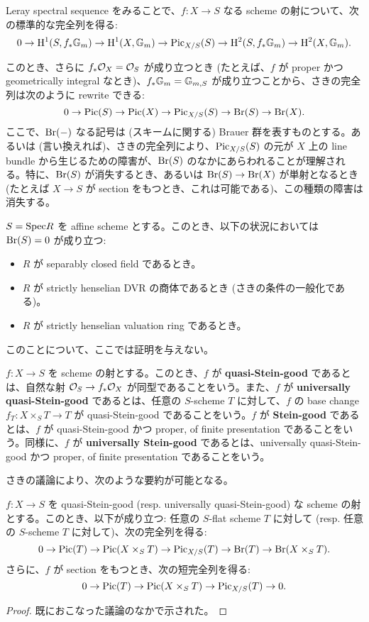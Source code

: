 Leray spectral sequence をみることで、$f \colon X \to S$ なる scheme の射について、次の標準的な完全列を得る: \[0 \to \mathrm{H}^1(S, f_*\mathbb{G}_m) \to \mathrm{H}^1(X, \mathbb{G}_m) \to \mathrm{Pic}_{X / S}(S) \to \mathrm{H}^2(S, f_*\mathbb{G}_m) \to \mathrm{H}^2(X, \mathbb{G}_m).\]

このとき、さらに $f_*\mathcal{O}_X = \mathcal{O}_S$ が成り立つとき (たとえば、$f$ が proper かつ geometrically integral なとき)、$f_*\mathbb{G}_m = \mathbb{G}_{m,S}$ が成り立つことから、さきの完全列は次のように rewrite できる: \[0 \to \mathrm{Pic}(S) \to \mathrm{Pic}(X) \to \mathrm{Pic}_{X / S}(S) \to \mathrm{Br}(S) \to \mathrm{Br}(X).\] ここで、$\mathrm{Br}(-)$ なる記号は (スキームに関する) Brauer 群を表すものとする。あるいは (言い換えれば)、さきの完全列により、$\mathrm{Pic}_{X / S}(S)$ の元が $X$ 上の line bundle から生じるための障害が、$\mathrm{Br}(S)$ のなかにあらわれることが理解される。特に、$\mathrm{Br}(S)$ が消失するとき、あるいは $\mathrm{Br}(S) \to \mathrm{Br}(X)$ が単射となるとき (たとえば $X \to S$ が section をもつとき、これは可能である)、この種類の障害は消失する。

\begin{note}
  $S = \mathrm{Spec} R$ を affine scheme とする。このとき、以下の状況においては $\mathrm{Br}(S) = 0$ が成り立つ:
  \begin{itemize}
    \item $R$ が separably closed field であるとき。
    \item $R$ が strictly henselian DVR の商体であるとき (さきの条件の一般化である)。
    \item $R$ が strictly henselian valuation ring であるとき。
  \end{itemize}
  このことについて、ここでは証明を与えない。
\end{note}

\begin{defn}
  $f \colon X \to S$ を scheme の射とする。このとき、$f$ が \textbf{quasi-Stein-good} であるとは、自然な射 $\mathcal{O}_S \to f_*\mathcal{O}_X$ が同型であることをいう。また、$f$ が \textbf{universally quasi-Stein-good} であるとは、任意の $S$-scheme $T$ に対して、$f$ の base change $f_T \colon X \times_S T \to T$ が quasi-Stein-good であることをいう。$f$ が \textbf{Stein-good} であるとは、$f$ が quasi-Stein-good かつ proper, of finite presentation であることをいう。同様に、$f$ が \textbf{universally Stein-good} であるとは、universally quasi-Stein-good かつ proper, of finite presentation であることをいう。
\end{defn}

さきの議論により、次のような要約が可能となる。

\begin{prop}\label{Prop:Rep_PicFunc}
  $f \colon X \to S$ を quasi-Stein-good (resp. universally quasi-Stein-good) な scheme の射とする。このとき、以下が成り立つ: 任意の $S$-flat scheme $T$ に対して (resp. 任意の $S$-scheme $T$ に対して)、次の完全列を得る: \[0 \to \mathrm{Pic}(T) \to \mathrm{Pic}(X \times_S T) \to \mathrm{Pic}_{X / S}(T) \to \mathrm{Br}(T) \to \mathrm{Br}(X \times_S T).\] さらに、$f$ が section をもつとき、次の短完全列を得る: \[0 \to \mathrm{Pic}(T) \to \mathrm{Pic}(X \times_S T) \to \mathrm{Pic}_{X / S}(T) \to 0.\]
\end{prop} 
\begin{proof}
  既におこなった議論のなかで示された。
\end{proof}

